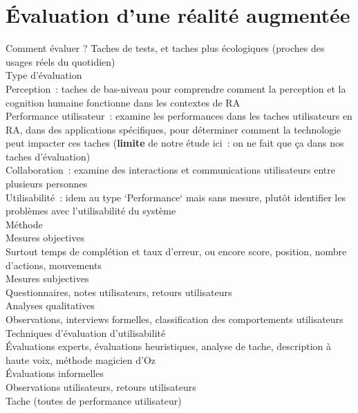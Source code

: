 \section*{Évaluation d'une réalité augmentée}
Comment évaluer ? Taches de tests, et taches plus écologiques (proches des usages réels du quotidien) \cite{DeSaChurchill2013} \\
	Type d'évaluation \cite{SwanGabbard2005} \cite{DuenserGrassetBillinghurst2008} \\
		Perception~: taches de bas-niveau pour comprendre comment la perception et la cognition humaine fonctionne dans les contextes de RA \\
		Performance utilisateur~: examine les performances dans les taches utilisateurs en RA, dans des applications spécifiques, pour déterminer comment la technologie peut impacter ces taches (\textbf{limite} de notre étude ici~: on ne fait que ça dans nos taches d'évaluation)\\
		Collaboration~: examine des interactions et communications utilisateurs entre plusieurs personnes \\
		Utilisabilité~: idem au type `Performance` mais sans mesure, plutôt identifier les problèmes avec l'utilisabilité du système \\
	Méthode \\
		Mesures objectives \\
			Surtout temps de complétion et taux d'erreur, ou encore score, position, nombre d'actions, mouvements \cite{DuenserGrassetBillinghurst2008} \\
		Mesures subjectives \\
			Questionnaires, notes utilisateurs, retours utilisateurs \cite{DuenserGrassetBillinghurst2008} \\
		Analyses qualitatives \\
			Observations, interviews formelles, classification des comportements utilisateurs \cite{DuenserGrassetBillinghurst2008} \\
		Techniques d'évaluation d'utilisabilité \\
			Évaluations experts, évaluations heuristiques, analyse de tache, description à haute voix, méthode magicien d'Oz \cite{DuenserGrassetBillinghurst2008} \\
		Évaluations informelles \\
			Observations utilisateurs, retours utilisateurs \cite{DuenserGrassetBillinghurst2008} \\
    Tache (toutes de performance utilisateur) \\
